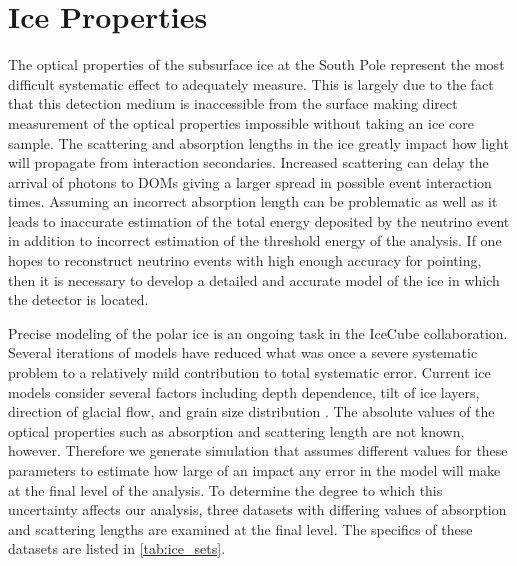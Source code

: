 \documentclass{gatech-thesis}
\begin{document}
\section{Ice Properties}
The optical properties of the subsurface ice at the South Pole represent the most difficult systematic effect to adequately measure. This is largely due to the fact that this detection medium is inaccessible from the surface making direct measurement of the optical properties impossible without taking an ice core sample. The scattering and absorption lengths in the ice greatly impact how light will propagate from interaction secondaries. Increased scattering can delay the arrival of photons to DOMs giving a larger spread in possible event interaction times. Assuming an incorrect absorption length can be problematic as well as it leads to inaccurate estimation of the total energy deposited by the neutrino event in addition to incorrect estimation of the threshold energy of the analysis. If one hopes to reconstruct neutrino events with high enough accuracy for pointing, then it is necessary to develop a detailed and accurate model of the ice in which the detector is located.

Precise modeling of the polar ice is an ongoing task in the IceCube collaboration. Several iterations of models have reduced what was once a severe systematic problem to a relatively mild contribution to total systematic error. Current ice models consider several factors including depth dependence, tilt of ice layers, direction of glacial flow, and grain size distribution \cite{2013arXiv1301.5361I}. The absolute values of the optical properties such as absorption and scattering length are not known, however. Therefore we generate simulation that assumes different values for these parameters to estimate how large of an impact any error in the model will make at the final level of the analysis. To determine the degree to which this uncertainty affects our analysis, three datasets with differing values of absorption and scattering lengths are examined at the final level. The specifics of these datasets are listed in \ref{tab:ice_sets}.
\end{document}

